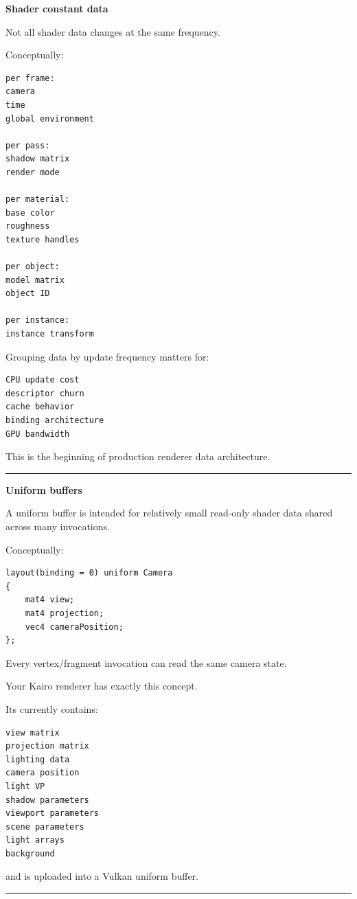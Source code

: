 \textbf{Shader constant data}

Not all shader data changes at the same frequency.

Conceptually:

\begin{verbatim}
per frame:
camera
time
global environment

per pass:
shadow matrix
render mode

per material:
base color
roughness
texture handles

per object:
model matrix
object ID

per instance:
instance transform
\end{verbatim}

Grouping data by update frequency matters for:

\begin{verbatim}
CPU update cost
descriptor churn
cache behavior
binding architecture
GPU bandwidth
\end{verbatim}

This is the beginning of production renderer data architecture.

\begin{center}\rule{0.5\linewidth}{0.5pt}\end{center}

\textbf{Uniform buffers}

A uniform buffer is intended for relatively small read-only shader data shared across many invocations.

Conceptually:

\begin{verbatim}
layout(binding = 0) uniform Camera
{
    mat4 view;
    mat4 projection;
    vec4 cameraPosition;
};
\end{verbatim}

Every vertex/fragment invocation can read the same camera state.

Your Kairo renderer has exactly this concept.

Its  currently contains:

\begin{verbatim}
view matrix
projection matrix
lighting data
camera position
light VP
shadow parameters
viewport parameters
scene parameters
light arrays
background
\end{verbatim}

and is uploaded into a Vulkan uniform buffer.

\begin{center}\rule{0.5\linewidth}{0.5pt}\end{center}


